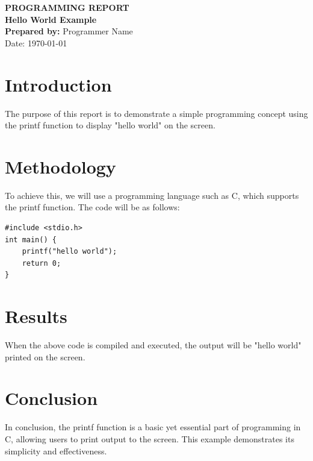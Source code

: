 \documentclass[12pt,a4paper]{report}
\begin{document}
\begin{titlepage}
    \centering
    {\Large\textbf{PROGRAMMING REPORT}}\\[2cm]
    {\Huge\textbf{Hello World Example}}\\[3cm]
    \textbf{Prepared by:} Programmer Name\\[0.5cm]
    {\large Date: \today}
\end{titlepage}

\tableofcontents
\newpage

\chapter{Introduction}
The purpose of this report is to demonstrate a simple programming concept using the printf function to display "hello world" on the screen.

\chapter{Methodology}
To achieve this, we will use a programming language such as C, which supports the printf function. The code will be as follows: 
\begin{verbatim}
#include <stdio.h>
int main() {
    printf("hello world");
    return 0;
}
\end{verbatim}

\chapter{Results}
When the above code is compiled and executed, the output will be "hello world" printed on the screen.

\chapter{Conclusion}
In conclusion, the printf function is a basic yet essential part of programming in C, allowing users to print output to the screen. This example demonstrates its simplicity and effectiveness.
\end{document}
